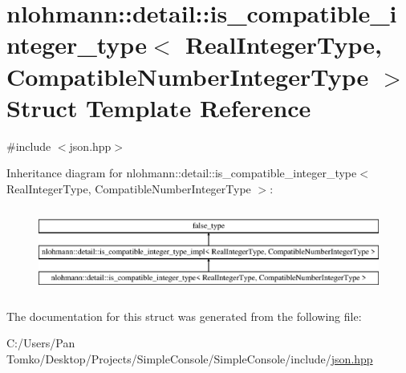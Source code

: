\hypertarget{structnlohmann_1_1detail_1_1is__compatible__integer__type}{}\section{nlohmann\+::detail\+::is\+\_\+compatible\+\_\+integer\+\_\+type$<$ Real\+Integer\+Type, Compatible\+Number\+Integer\+Type $>$ Struct Template Reference}
\label{structnlohmann_1_1detail_1_1is__compatible__integer__type}


{\ttfamily \#include $<$json.\+hpp$>$}

Inheritance diagram for nlohmann\+::detail\+::is\+\_\+compatible\+\_\+integer\+\_\+type$<$ Real\+Integer\+Type, Compatible\+Number\+Integer\+Type $>$\+:\begin{figure}[H]
\begin{center}
\leavevmode
\includegraphics[height=2.818792cm]{d1/d21/structnlohmann_1_1detail_1_1is__compatible__integer__type}
\end{center}
\end{figure}


The documentation for this struct was generated from the following file\+:\begin{DoxyCompactItemize}
\item 
C\+:/\+Users/\+Pan Tomko/\+Desktop/\+Projects/\+Simple\+Console/\+Simple\+Console/include/\mbox{\hyperlink{json_8hpp}{json.\+hpp}}\end{DoxyCompactItemize}
